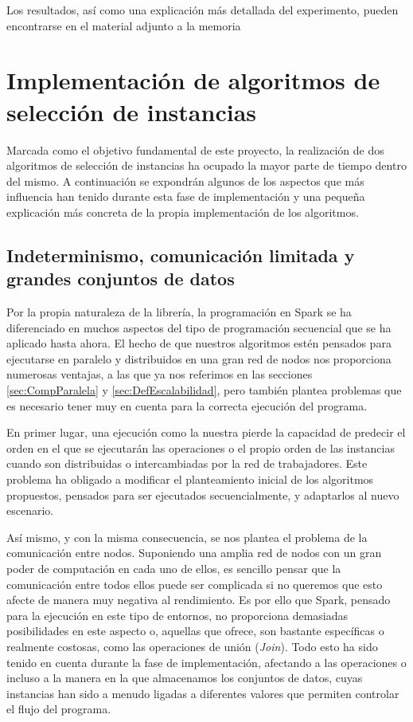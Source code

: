 Los resultados, así como una explicación más detallada del experimento, pueden encontrarse en el material adjunto a la memoria




\section{Implementación de algoritmos de selección de instancias}

Marcada como el objetivo fundamental de este proyecto, la realización de dos algoritmos de selección de instancias ha ocupado la mayor parte de tiempo dentro del mismo. A continuación se expondrán algunos de los aspectos que más influencia han tenido durante esta fase de implementación y una pequeña explicación más concreta de la propia implementación de los algoritmos.


\subsection{Indeterminismo, comunicación limitada y grandes conjuntos de datos}

Por la propia naturaleza de la librería, la programación en Spark se ha diferenciado en muchos aspectos del tipo de programación secuencial que se ha aplicado hasta ahora. El hecho de que nuestros algoritmos estén pensados para ejecutarse en paralelo y distribuidos en una gran red de nodos nos proporciona numerosas ventajas, a las que ya nos referimos en las secciones \ref{sec:CompParalela} y \ref{sec:DefEscalabilidad}, pero también plantea problemas que es necesario tener muy en cuenta para la correcta ejecución del programa.

En primer lugar, una ejecución como la nuestra pierde la capacidad de predecir el orden en el que se ejecutarán las operaciones o el propio orden de las instancias cuando son distribuidas o intercambiadas por la red de trabajadores. Este problema ha obligado a modificar el planteamiento inicial de los algoritmos propuestos, pensados para ser ejecutados secuencialmente, y adaptarlos al nuevo escenario.

Así mismo, y con la misma consecuencia, se nos plantea el problema de la comunicación entre nodos. Suponiendo una amplia red de nodos con un gran poder de computación en cada uno de ellos, es sencillo pensar que la comunicación entre todos ellos puede ser complicada si no queremos que esto afecte de manera muy negativa al rendimiento. Es por ello que Spark, pensado para la ejecución en este tipo de entornos, no proporciona demasiadas posibilidades en este aspecto o, aquellas que ofrece, son bastante específicas o realmente costosas, como las operaciones de unión (\textit{Join}). Todo esto ha sido tenido en cuenta durante la fase de implementación, afectando a las operaciones o incluso a la manera en la que almacenamos los conjuntos de datos, cuyas instancias han sido a menudo ligadas a diferentes valores que permiten controlar el flujo del programa.

